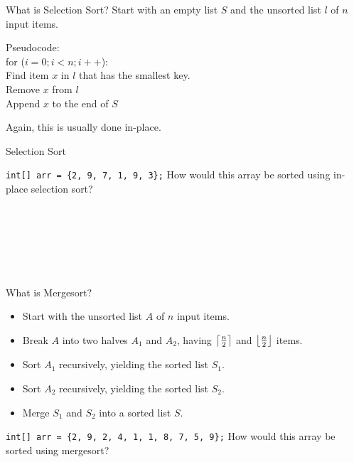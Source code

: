\documentclass[9pt]{beamer}
\DeclarePairedDelimiter{\ceil}{\lceil}{\rceil}
\DeclarePairedDelimiter{\floor}{\lfloor}{\rfloor}
\begin{document}
\begin{frame}{What is Selection Sort?}
Start with an empty list $S$ and the unsorted list $l$ of $n$ input items. \newline 

Pseudocode:\\
for ($i = 0; i < n; i++$):\\
\hspace*{2em} Find item $x$ in $l$ that has the smallest key.\\
\hspace*{2em} Remove $x$ from $l$\\
\hspace*{2em} Append $x$ to the end of $S$ \newline

Again, this is usually done in-place.
\end{frame}

\begin{frame}{Selection Sort}

{\tt int[] arr = \{2, 9, 7, 1, 9, 3\};} \newline
How would this array be sorted using in-place selection sort? \newline

\\
\\
\\
\\
\\
\end{frame}

\begin{frame}{What is Mergesort?}
\begin{itemize}
\item Start with the unsorted list $A$ of $n$ input items.
\item Break $A$ into two halves $A_1$ and $A_2$, having $\ceil*{\frac{n}{2}}$ and $\floor*{\frac{n}{2}}$ items.
\item Sort $A_1$ recursively, yielding the sorted list $S_1$.
\item Sort $A_2$ recursively, yielding the sorted list $S_2$.
\item Merge $S_1$ and $S_2$ into a sorted list $S$.
\end{itemize}

{\tt int[] arr = \{2, 9, 2, 4, 1, 1, 8, 7, 5, 9\};} \newline
How would this array be sorted using mergesort? \newline \newline \newline \newline \newline
\end{frame}
\end{document}
